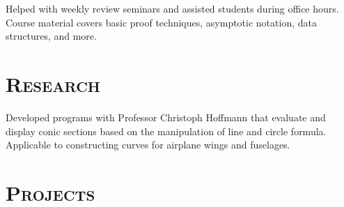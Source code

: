 \begin{resume}
\begin{formatb}
  \\
  \body\\
\end{formatb}

\begin{position}
  Helped with weekly review seminars and assisted students during office hours. Course material covers basic proof techniques, asymptotic notation, data structures, and more.
\end{position}

\section{\textsc{Research}}

\begin{position}
    Developed programs with Professor Christoph Hoffmann that evaluate and display conic sections based on the manipulation of line and circle formula. Applicable to constructing curves for airplane wings and fuselages.
\end{position}



\section{\textsc{Projects}}


\begin{formatb}
  \\
  \body\\
\end{formatb}


\end{resume}
